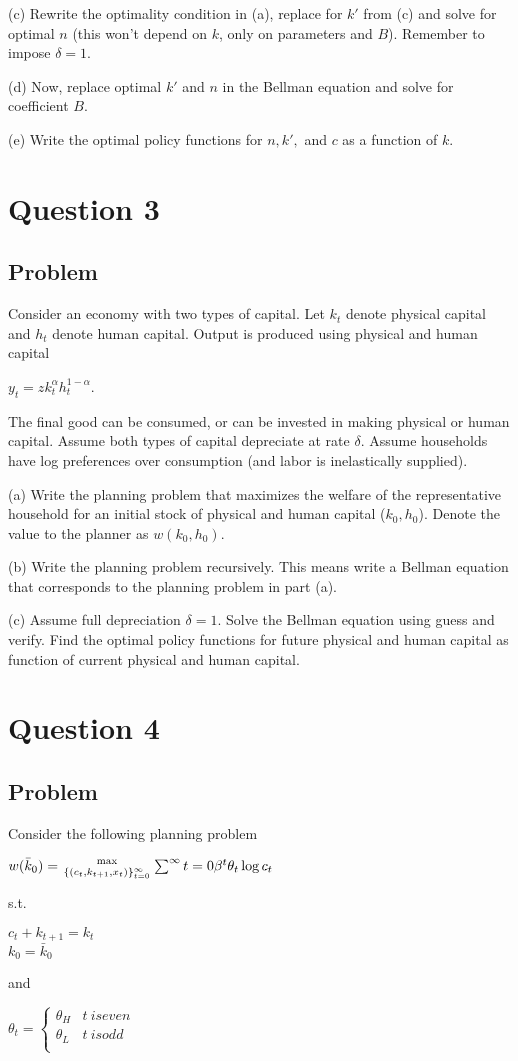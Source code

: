 \documentclass[10pt, a4paper]{article}
\begin{document}
    (c) Rewrite the optimality condition in (a), replace for $k'$ from (c) and solve for optimal $n$ (this won't depend on $k$, only on parameters and $B$). Remember to impose $\delta=1$.

    (d) Now, replace optimal $k'$ and $n$ in the Bellman equation and solve for coefficient $B$.

    (e) Write the optimal policy functions for $n,k',$ and $c$ as a function of $k$.
\section{Question 3}
  \subsection{Problem}
    Consider an economy with two types of capital. Let $k_t$ denote physical capital and $h_t$ denote human capital. Output is produced using physical and human capital
    \begin{center}
      $y_t=zk_t^{\alpha}h_t^{1-\alpha}$.
    \end{center}
    The final good can be consumed, or can be invested in making physical or human capital. Assume both types of capital depreciate at rate $\delta$. Assume households have log preferences over consumption (and labor is inelastically supplied).

    (a) Write the planning problem that maximizes the welfare of the representative household for an initial stock of physical and human capital ($k_0,h_0$). Denote the value to the planner as $w(k_0,h_0)$.

    (b) Write the planning problem recursively. This means write a Bellman equation that corresponds to the planning problem in part (a).

    (c) Assume full depreciation $\delta=1$. Solve the Bellman equation using guess and verify. Find the optimal policy functions for future physical and human capital as function of current physical and human capital.
\section{Question 4}
  \subsection{Problem}
    Consider the following planning problem
    \begin{center}
      $w(\bar k_0)={\max\atop{\{(c_t,k_{t+1},x_t)\}_{t=0}^{\infty}}}\sum^{\infty}{t=0}\beta^t\theta_t\log c_t$
    \end{center}
    s.t.
    \begin{center}
      $c_t+k_{t+1} = k_t$ \\
      $k_0=\bar k_0$
    \end{center}
    and
    \begin{center}
      $\theta_t = \begin{cases} 
        \theta_H & t \ {is even} \\
        \theta_L & t \ {is odd} \\
      \end{cases}$
    \end{center}
    
\end{document}
